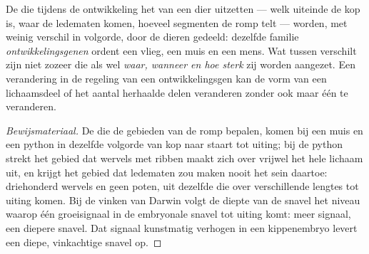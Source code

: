 \begin{proposition}\label{prop:g12:diversification-of-life:development}
De  die tijdens de ontwikkeling het  van een dier uitzetten
--- welk uiteinde de kop is, waar de ledematen komen, hoeveel segmenten de
romp telt --- worden, met weinig verschil in volgorde, door de dieren
gedeeld: dezelfde familie \emph{ontwikkelingsgenen}
ordent een vlieg, een muis en een mens. Wat tussen  verschilt zijn
niet zozeer die  als wel \emph{waar, wanneer en hoe sterk} zij
worden aangezet. Een verandering in de regeling van een ontwikkelingsgen
kan de vorm van een lichaamsdeel of het aantal herhaalde delen veranderen
zonder ook maar één  te veranderen.
\end{proposition}
\begin{proof}[Bewijsmateriaal]
De  die de gebieden van de romp bepalen, komen bij een muis en een
python in dezelfde volgorde van kop naar staart tot uiting; bij de python
strekt het gebied dat wervels met ribben maakt zich over vrijwel het hele
lichaam uit, en krijgt het gebied dat ledematen zou maken nooit het sein
daartoe: driehonderd wervels en geen poten, uit dezelfde  die over
verschillende lengtes tot uiting komen. Bij de vinken van Darwin volgt de
diepte van de snavel het niveau waarop één groeisignaal in de embryonale
snavel tot uiting komt: meer signaal, een diepere snavel. Dat signaal
kunstmatig verhogen in een kippenembryo levert een diepe, vinkachtige
snavel op.
\end{proof}

